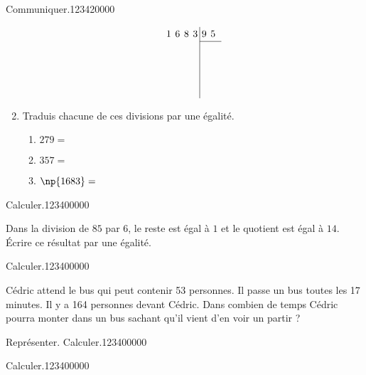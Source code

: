 \begin{pageAD}
\begin{ExoCad}{Communiquer.}{1234}{2}{0}{0}{0}{0}
\begin{enumerate}
\begin{minipage}{0.3\linewidth}
\end{minipage}
\begin{minipage}{0.3\linewidth}
\begin{equation*}
\renewcommand{\arraystretch}{1.2}
\renewcommand{\arraycolsep}{2pt}
  \begin{array}{rrrr|rrr}
1 & 6  & 8 & 3 & 9 & 5 \\
\cline{5-7}
 & &  &  &  & \\
    & &  &  &   &   &  \\
    &  &  &  &   &   &  \\
    &&  &  &   &   &  \\
  \end{array}
\end{equation*}
\end{minipage}


\item Traduis chacune de ces divisions par une égalité. 

\begin{enumerate}
\item $279 = $ 
\item $357 = $ 
\item $\np{1683} = $ 
\end{enumerate}
\end{enumerate}
\end{ExoCad}



\begin{ExoCad}{Calculer.}{1234}{0}{0}{0}{0}{0}

 Dans la division de $85$ par $6$, le reste est égal à $1$ et le quotient est égal à $14$. Écrire ce résultat par une égalité.
 
 
\end{ExoCad}

\begin{ExoCad}{Calculer.}{1234}{0}{0}{0}{0}{0}

 Cédric attend le bus qui peut contenir 53 personnes. Il passe un bus toutes les 17 minutes. Il y a 164 personnes devant
Cédric. Dans combien de temps Cédric pourra monter dans un bus sachant qu'il vient d'en voir un partir ?
\end{ExoCad}



\begin{ExoCad}{Représenter. Calculer.}{1234}{0}{0}{0}{0}{0}

 
 
\end{ExoCad}

\begin{ExoCad}{Calculer.}{1234}{0}{0}{0}{0}{0}

 
\end{ExoCad}

 
\end{pageAD}


